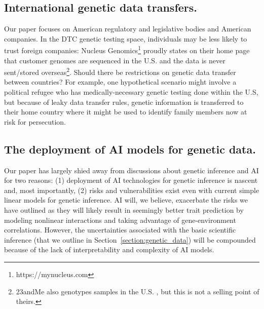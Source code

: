 \subsection{International genetic data transfers.}
 Our paper focuses on American regulatory and legislative bodies and American companies. In the DTC genetic testing space, individuals may be less likely to trust foreign companies: Nucleus Genomics\footnote{https://mynucleus.com} proudly states on their home page that customer genomes are sequenced in the U.S. and the data is never sent/stored overseas\footnote{23andMe also genotypes samples in the U.S. \cite{23andme_what_2024}, but this is not a selling point of theirs.}. Should there be restrictions on genetic data transfer between countries? For example, one hypothetical scenario might involve a political refugee who has medically-necessary genetic testing done within the U.S, but because of leaky data transfer rules, genetic information is transferred to their home country where it might be used to identify family members now at risk for persecution.


\subsection{The deployment of AI models for genetic data.}
\label{challenges:ai}

Our paper has largely shied away from discussions about genetic inference and AI for two reasons: (1) deployment of AI technologies for genetic inference is nascent and, most importantly, (2) risks and vulnerabilities exist even with current simple linear models for genetic inference. AI will, we believe, exacerbate the risks we have outlined as they will likely result in seemingly better trait prediction by modeling nonlinear interactions and taking advantage of gene-environment correlations\cite{yang_advancing_2024}. However, the uncertainties associated with the basic scientific inference (that we outline in Section~\ref{section:genetic_data}) will be compounded because of the lack of interpretability and complexity of AI models. 

